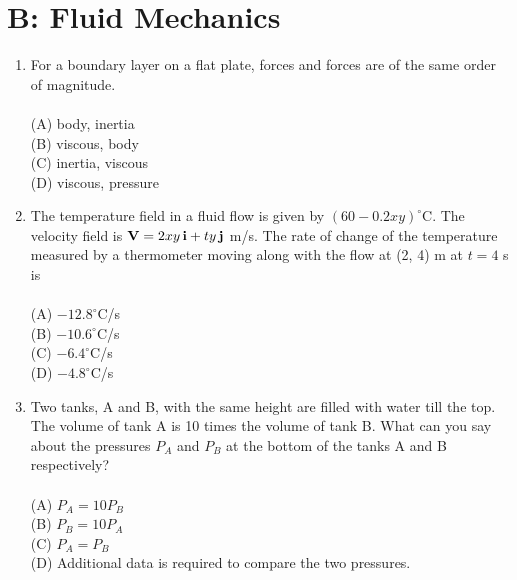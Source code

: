 \documentclass[journal,12pt,onecolumn]{IEEEtran}
\begin{document}
\section*{B: Fluid Mechanics}
\vspace{1cm}
\begin{enumerate}

\item For a boundary layer on a flat plate, \underline{\hspace{2cm}} forces and \underline{\hspace{2cm}} forces are of the same order of magnitude.\\
\vspace{0.2cm}
\hfill{} \\
(A) body, inertia\\
(B) viscous, body\\
(C) inertia, viscous\\
(D) viscous, pressure
\vspace{0.5cm}

\item The temperature field in a fluid flow is given by $(60 - 0.2 x y)^\circ$C. The velocity field is ${\bf V} = 2 x y\, \mathbf{i} + t y\, \mathbf{j}$ m/s. The rate of change of the temperature measured by a thermometer moving along with the flow at (2, 4) m at $t=4$ s is\\
\vspace{0.2cm}
\hfill{} \\
(A) $-12.8^\circ$C/s\\
(B) $-10.6^\circ$C/s\\
(C) $-6.4^\circ$C/s\\
(D) $-4.8^\circ$C/s
\vspace{0.5cm}

\item Two tanks, A and B, with the same height are filled with water till the top. The volume of tank A is 10 times the volume of tank B. What can you say about the pressures $P_A$ and $P_B$ at the bottom of the tanks A and B respectively?\\
\vspace{0.2cm}
\hfill{} \\
(A) $P_A = 10 P_B$\\
(B) $P_B = 10 P_A$\\
(C) $P_A = P_B$\\
(D) Additional data is required to compare the two pressures.
\vspace{0.5cm}


\end{enumerate}
\end{document}
